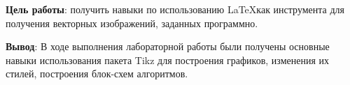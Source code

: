 \documentclass[a4paper,14pt]{article}
\begin{document}

\large{
    \par \textbf{Цель работы}: получить навыки по использованию \LaTeX как инструмента для получения векторных изображений, заданных программно.

    \bigskip
    \texttt{}
    \bigskip

    

    \large{
        \par \textbf{Вывод}: В ходе выполнения лабораторной работы были получены основные навыки использования пакета Tikz для построения графиков, изменения их стилей, построения блок-схем алгоритмов.
    }
}
\end{document}
